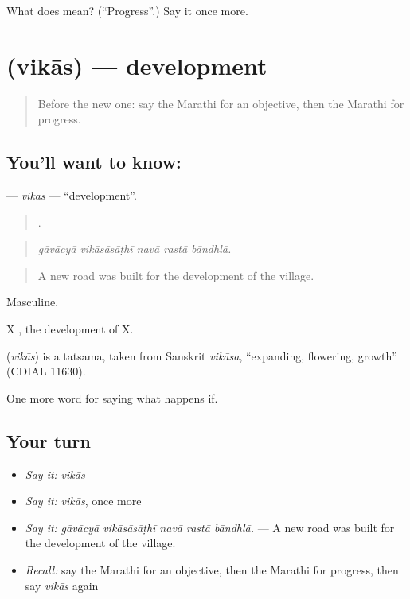 \begin{tcolorbox}[breakable,colback=teal!4,colframe=teal!35!black,title={Before you move on}]
What does  mean? (\textquotedblleft{}Progress\textquotedblright{}.) Say it once more.
\end{tcolorbox}
\section[\texorpdfstring{\mr{विकास} (vikās)}{विकास (vikās)}]{ (vikās) — development}

\label{lesson:MR-C388-vikas}



\begin{quote}
Before the new one: say the Marathi for an objective, then the Marathi for progress.
\end{quote}

\subsection*{You'll want to know: }
\textbf{} — \emph{vikās} — \textquotedblleft{}development\textquotedblright{}.

\begin{quote}
    .
\end{quote}

\begin{quote}
\emph{gāvācyā vikāsāsāṭhī navā rastā bāndhlā.}
\end{quote}

\begin{quote}
A new road was built for the development of the village.
\end{quote}

Masculine.

X  , the development of X.

\begin{cousinweb}
\textbf{} (\emph{vikās}) is a tatsama, taken from Sanskrit \emph{vikāsa}, \textquotedblleft{}expanding, flowering, growth\textquotedblright{} (CDIAL 11630).
\end{cousinweb}

\begin{grammarlens}[title={What you've built}]
One more word for saying what happens if.
\end{grammarlens}

\subsection*{Your turn}
\begin{itemize}
\raggedright
  \item \emph{Say it:} \emph{vikās}
  \item \emph{Say it:} \emph{vikās}, once more
  \item \emph{Say it:} \emph{gāvācyā vikāsāsāṭhī navā rastā bāndhlā.} — A new road was built for the development of the village.
  \item \emph{Recall:} say the Marathi for an objective, then the Marathi for progress, then say \emph{vikās} again
\end{itemize}

